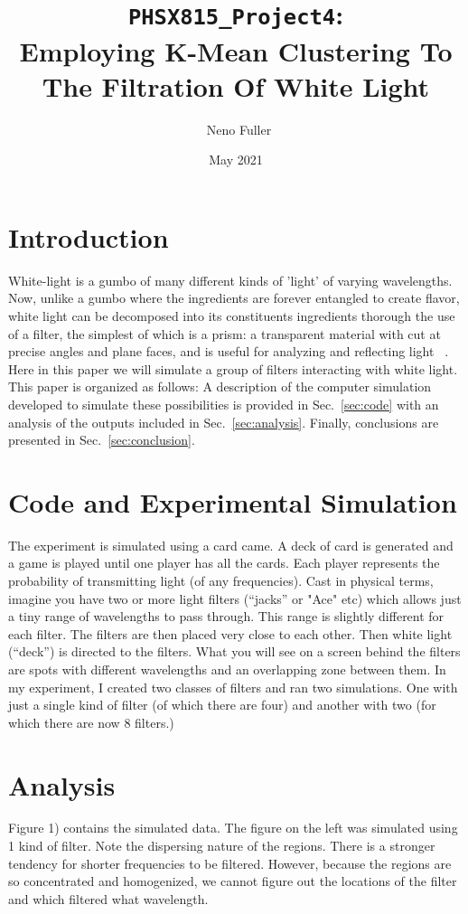 \documentclass[11pt]{article}
\title{ \texttt{PHSX815\_Project4}: \\ Employing K-Mean Clustering To The Filtration Of White Light}
\author{~Neno Fuller}
\date{May 2021}
\begin{document}
\maketitle

\section{Introduction \label{sec:intro}}

White-light is a gumbo of many different kinds of 'light' of varying wavelengths. Now, unlike a gumbo where the ingredients are forever entangled to create flavor, white light can be decomposed into its constituents ingredients thorough the use of a filter, the simplest of which is a prism: a transparent material with cut at precise angles and plane faces, and is useful for analyzing and reflecting light ~\cite{Light}. Here in this paper we will simulate a group of filters interacting with white light. This paper is organized as follows: A description of the computer simulation developed to simulate these possibilities is provided in Sec.~\ref{sec:code} with an analysis of the outputs included in Sec.~\ref{sec:analysis}. Finally, conclusions are presented in Sec.~\ref{sec:conclusion}.

\section{Code and Experimental Simulation \label{sec:code}}
The experiment is simulated using a card came. A deck of card is generated and a game is played until one player has all the cards. Each player represents the probability of transmitting light (of any frequencies). Cast in physical terms, imagine you have two or more light filters (“jacks” or "Ace" etc) which allows just a tiny range of wavelengths to pass through. This range is slightly different for each filter. The filters are then placed very close to each other. Then white light (“deck”) is directed to the filters. What you will see on a screen behind the filters are spots with different wavelengths and an overlapping zone between them. In my experiment, I created two classes of filters and ran two simulations. One with just  a single kind of filter (of which there are four) and another with two (for which there are now 8 filters.)

\section{Analysis \label{sec:analysis}}
Figure 1) contains the simulated data. The figure on the left was simulated using 1 kind of filter. Note the dispersing nature of the regions. There is a stronger tendency for shorter frequencies to be filtered. However, because the regions are so concentrated and homogenized, we cannot figure out the locations of the filter and which filtered what wavelength. 
\end{document}
